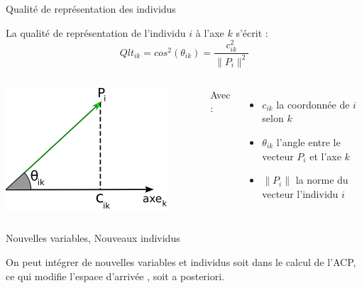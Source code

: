 \documentclass{beamer}
\begin{document}
\begin{frame}{Qualité de représentation des individus}

La \alert{qualité de représentation} de l'individu $i$ à l'axe $k$ s'écrit : 
$$Qlt_{ik}=cos^2(\theta_{ik})= \frac{c_{ik}^2}{\|P_i\| ^2}$$



\begin{columns}[T,onlytextwidth]

\colorbox{white}{\includegraphics[width=0.85\textwidth,keepaspectratio]{img/angle_qualite_repres_axe.png}}


  Avec : 
  \begin{itemize}
  \setlength\itemsep{-0.1em}
  \item $c_{ik}$ la coordonnée de $i$ selon $k$
  \item $\theta_{ik}$ l'angle entre le vecteur $P_i$ et l'axe $k$
  \item $\|P_i\|$ la norme du vecteur  l'individu $i$
\end{itemize}
\end{columns}

\end{frame}


\begin{frame}{Nouvelles variables, Nouveaux individus}


On peut intégrer de nouvelles variables et individus soit dans le calcul de l'ACP, ce qui modifie l'espace d'arrivée , soit \alert{a posteriori}.



\end{frame}
\end{document}

